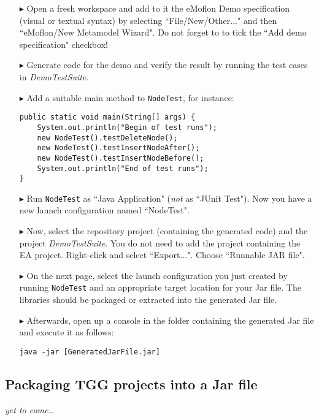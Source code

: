\begin{itemize}
    
\item[$\blacktriangleright$] 
Open a fresh workspace and add to it the eMoflon Demo specification (visual or textual syntax) by selecting ``File/New/Other..." and then ``eMoflon/New Metamodel Wizard".
Do not forget to to tick the ``Add demo specification" checkbox!
    
\item[$\blacktriangleright$]
Generate code for the demo and verify the result by running the test cases in \emph{DemoTestSuite}.

\item[$\blacktriangleright$]
Add a suitable main method to \texttt{NodeTest}, for instance:
\begin{lstlisting}
public static void main(String[] args) {
    System.out.println("Begin of test runs");
    new NodeTest().testDeleteNode();
    new NodeTest().testInsertNodeAfter();
    new NodeTest().testInsertNodeBefore();
    System.out.println("End of test runs");
}
\end{lstlisting}

\item[$\blacktriangleright$]
Run \texttt{NodeTest} as ``Java Application" (\emph{not} as ``JUnit Test").
Now you have a new launch configuration named ``NodeTest".

\item[$\blacktriangleright$]
Now, select the repository project (containing the generated code) and the project \emph{DemoTestSuite}.
You do not need to add the project containing the EA project.
Right-click and select ``Export...".
Choose ``Runnable JAR file".
  
\item[$\blacktriangleright$]
On the next page, select the launch configuration you just created by running \texttt{NodeTest} and an appropriate target location for your Jar file.
The libraries should be packaged or extracted into the generated Jar file.

\item[$\blacktriangleright$]
Afterwards, open up a console in the folder containing the generated Jar file and execute it as follows:
\begin{lstlisting}
java -jar [GeneratedJarFile.jar]
\end{lstlisting}

    
\end{itemize}

\subsection{Packaging TGG projects into a Jar file}
\emph{yet to come\dots}

